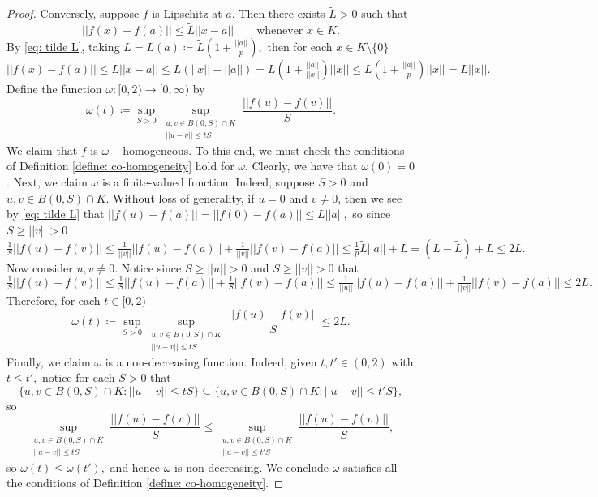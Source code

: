 \documentclass{article}
\begin{document}
\begin{proof}
Conversely, suppose $f$ is Lipschitz at $a.$ Then there exists $\tilde{L}>0$ such that
\begin{equation} \label{eq: tilde L}
   ||f(x)-f(a)||\leq \tilde{L}||x-a|| \qquad \text{whenever }x \in K.
\end{equation}
By \eqref{eq: tilde L}, taking $L= L(a) \coloneqq \tilde{L}\left(1+\tfrac{||a||}{p}\right),$ then for each $x \in K \setminus \{0\}$
\begin{equation} \label{eq: L}
    ||f(x)-f(a)|| \leq \tilde{L}||x-a||\leq \tilde{L}(||x|| + ||a||) = \tilde{L}\left(1+\tfrac{||a||}{||x||}\right)||x|| \leq \tilde{L}\left(1+\tfrac{||a||}{p}\right)||x|| = L||x||.
\end{equation}
Define the function $\omega:[0,2) \to [0,\infty)$ by
$$\omega(t) \coloneqq \sup_{S>0} \sup_{\substack{u,v \in B(0,S) \cap K\\||u-v|| \leq tS}} \frac{||f(u)-f(v)||}{S}.$$
We claim that $f$ is $\omega-$homogeneous. To this end, we must check the conditions of Definition \ref{define: co-homogeneity} hold for $\omega$. Clearly, we have that $\omega(0) = 0$. Next, we claim $\omega$ is a finite-valued function. Indeed, suppose $S >0$ and $u,v \in B(0,S)\cap K$. Without loss of generality, if $u = 0$ and $v \neq 0$, then we see by \eqref{eq: tilde L} that $||f(u)-f(a)|| = ||f(0)-f(a)|| \leq \tilde{L}||a||,$ so since $S \geq ||v|| >0$
$$ \tfrac{1}{S}{||f(u)-f(v)||} \leq \tfrac{1}{||v||}{||f(u)-f(a)||}+\tfrac{1}{||v||}{||f(v)-f(a)||} \leq \tfrac{1}{p}{\tilde{L}||a||} + L= (L-\tilde{L})+L\leq 2L.$$
Now consider $u, v \neq 0.$
Notice since $S \geq ||u||>0$ and $S \geq ||v||>0$ that
\begin{equation*}
     \tfrac{1}{S}{||f(u)-f(v)||} \leq \tfrac{1}{S}{||f(u)-f(a)||}+\tfrac{1}{S}{||f(v)-f(a)||} \leq \tfrac{1}{||u||}{||f(u)-f(a)||}+\tfrac{1}{||v||}{||f(v)-f(a)||} \leq 2L.
\end{equation*}
    Therefore, for each $t \in [0,2)$ $$\omega(t) \coloneqq \sup_{S>0} \sup_{\substack{u,v \in B(0,S) \cap K\\||u-v|| \leq tS}}  \frac{||f(u)-f(v)||}{S} \leq 2L.$$
    Finally, we claim $\omega$ is a non-decreasing function. Indeed, given $t, t' \in (0,2)$ with $t \leq t',$ notice for each $S >0$ that $$\{u,v \in B(0,S)\cap K: ||u-v|| \leq tS\} \subseteq \{u,v \in B(0,S)\cap K: ||u-v|| \leq t'S\},$$ so
    $$\sup_{\substack{u,v \in B(0,S)\cap K\\||u-v|| \leq tS}} \frac{||f(u)-f(v)||}{S} \leq  \sup_{\substack{u,v \in B(0,S)\cap K\\||u-v|| \leq t'S}} \frac{||f(u)-f(v)||}{S},$$
    so $\omega(t) \leq \omega(t'),$ and hence $\omega$ is non-decreasing.
     We conclude $\omega$ satisfies all the conditions of Definition \ref{define: co-homogeneity}.
    

\end{proof}
\end{document}
